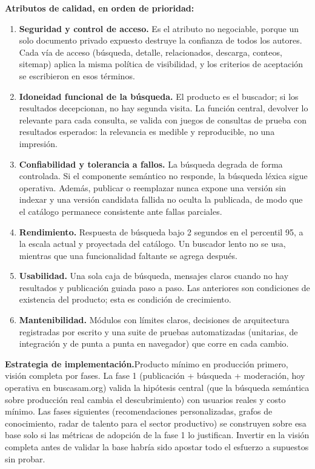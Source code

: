 \documentclass[12pt,a4paper]{article}
\begin{document}
\medskip
\noindent\textbf{Atributos de calidad, en orden de prioridad:}
\begin{enumerate}
  \item \textbf{Seguridad y control de acceso.} Es el atributo no negociable, porque un solo documento privado expuesto destruye la confianza de todos los autores. Cada vía de acceso (búsqueda, detalle, relacionados, descarga, conteos, sitemap) aplica la misma política de visibilidad, y los criterios de aceptación se escribieron en esos términos.
  \item \textbf{Idoneidad funcional de la búsqueda.} El producto es el buscador; si los resultados decepcionan, no hay segunda visita. La función central, devolver lo relevante para cada consulta, se valida con juegos de consultas de prueba con resultados esperados: la relevancia es medible y reproducible, no una impresión.
  \item \textbf{Confiabilidad y tolerancia a fallos.} La búsqueda degrada de forma controlada. Si el componente semántico no responde, la búsqueda léxica sigue operativa. Además, publicar o reemplazar nunca expone una versión sin indexar y una versión candidata fallida no oculta la publicada, de modo que el catálogo permanece consistente ante fallas parciales.
  \item \textbf{Rendimiento.} Respuesta de búsqueda bajo 2 segundos en el percentil 95, a la escala actual y proyectada del catálogo. Un buscador lento no se usa, mientras que una funcionalidad faltante se agrega después.
  \item \textbf{Usabilidad.} Una sola caja de búsqueda, mensajes claros cuando no hay resultados y publicación guiada paso a paso. Las anteriores son condiciones de existencia del producto; esta es condición de crecimiento.
  \item \textbf{Mantenibilidad.} Módulos con límites claros, decisiones de arquitectura registradas por escrito y una suite de pruebas automatizadas (unitarias, de integración y de punta a punta en navegador) que corre en cada cambio.
\end{enumerate}

\medskip
\noindent\textbf{Estrategia de implementación.}\enspace Producto mínimo en producción primero, visión completa por fases. La fase 1 (publicación + búsqueda + moderación, hoy operativa en buscasam.org) valida la hipótesis central (que la búsqueda semántica sobre producción real cambia el descubrimiento) con usuarios reales y costo mínimo. Las fases siguientes (recomendaciones personalizadas, grafos de conocimiento, radar de talento para el sector productivo) se construyen sobre esa base solo si las métricas de adopción de la fase 1 lo justifican. Invertir en la visión completa antes de validar la base habría sido apostar todo el esfuerzo a supuestos sin probar.
\end{document}
